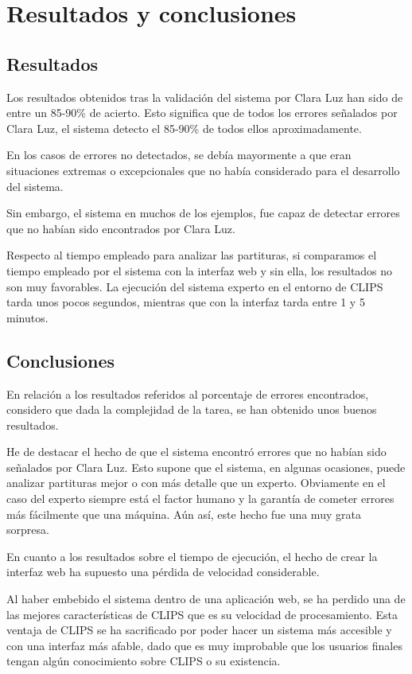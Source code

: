 \chapter{Resultados y conclusiones}

\section{Resultados}

Los resultados obtenidos tras la validación del sistema por Clara Luz han sido de entre un 85-90\% de acierto. Esto significa que de todos los errores señalados por Clara Luz, el sistema detecto el 85-90\% de todos ellos aproximadamente.

En los casos de errores no detectados, se debía mayormente a que eran situaciones extremas o excepcionales que no había considerado para el desarrollo del sistema.

Sin embargo, el sistema en muchos de los ejemplos, fue capaz de detectar errores que no habían sido encontrados por Clara Luz.

\bigskip
Respecto al tiempo empleado para analizar las partituras, si comparamos el tiempo empleado por el sistema con la interfaz web y sin ella, los resultados no son muy favorables. La ejecución del sistema experto en el entorno de CLIPS tarda unos pocos segundos, mientras que con la interfaz tarda entre 1 y 5 minutos. 

\section{Conclusiones}

En relación a los resultados referidos al porcentaje de errores encontrados, considero que dada la complejidad de la tarea, se han obtenido unos buenos resultados. 

He de destacar el hecho de que el sistema encontró errores que no habían sido señalados por Clara Luz. Esto supone que el sistema, en algunas ocasiones, puede analizar partituras mejor o con más detalle que un experto. Obviamente en el caso del experto siempre está el factor humano y la garantía de cometer errores más fácilmente que una máquina. Aún así, este hecho fue una muy grata sorpresa.

\bigskip
En cuanto a los resultados sobre el tiempo de ejecución, el hecho de crear la interfaz web ha supuesto una pérdida de velocidad considerable. 

Al haber embebido el sistema dentro de una aplicación web, se ha perdido una de las mejores características de CLIPS que es su velocidad de procesamiento. Esta ventaja de CLIPS se ha sacrificado por poder hacer un sistema más accesible y con una interfaz más afable, dado que es muy improbable que los usuarios finales tengan algún conocimiento sobre CLIPS o su existencia.

